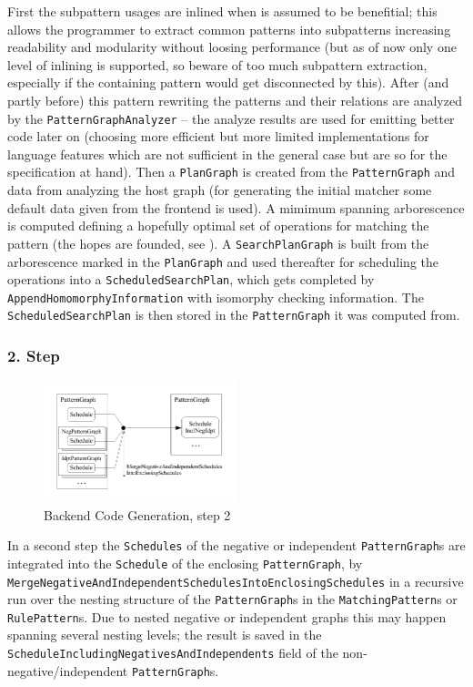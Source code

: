 First the subpattern usages are inlined when  is assumed to be benefitial; this allows the programmer to extract common patterns into subpatterns increasing readability and modularity without loosing performance (but as of now only one level of inlining is supported, so beware of too much subpattern extraction, especially if the containing pattern would get disconnected by this). 
After (and partly before) this pattern rewriting the patterns and their relations are analyzed by the \texttt{PatternGraphAnalyzer} -- the analyze results are used for emitting better code later on (choosing more efficient but more limited implementations for language features which are not sufficient in the general case but are so for the specification at hand).
Then a \texttt{PlanGraph} is created from the \texttt{PatternGraph} and data from analyzing the host graph (for generating the initial matcher some default data given from the frontend is used).
A mimimum spanning arborescence is computed defining a hopefully optimal set of operations for matching the pattern (the hopes are founded, see \cite{BKG:07}).
A \texttt{SearchPlanGraph} is built from the arborescence marked in the \texttt{PlanGraph} and used thereafter for scheduling the operations into a \texttt{ScheduledSearchPlan}, which gets completed by \texttt{Append\-Homomorphy\-Information} with isomorphy checking information.
The \texttt{ScheduledSearchPlan} is then stored in the \texttt{PatternGraph} it was computed from.


\subsubsection*{2. Step}

\begin{figure}[htbp]
  \centering
  \includegraphics[width=0.5\textwidth]{fig/AblaufCodeerzeugungBackend2}
  \caption{Backend Code Generation, step 2}
  \label{figbackendcodegen2}
\end{figure}

In a second step the \texttt{Schedules} of the negative or independent \texttt{Pattern\-Graph}s are integrated into the \texttt{Schedule} of the enclosing \texttt{Pattern\-Graph}, by \texttt{Merge\-Negative\-And\-Independent\-Schedules\-Into\-Enclosing\-Schedules} in a recursive run over the nesting structure of the \texttt{Pattern\-Graph}s in the \texttt{Matching\-Pattern}s or \texttt{Rule\-Pattern}s.
Due to nested negative or independent graphs this may happen spanning several nesting levels;
the result is saved in the \texttt{Schedule\-Including\-Negatives\-And\-Independents} field of the non-negative/independent \texttt{Pattern\-Graph}s.


